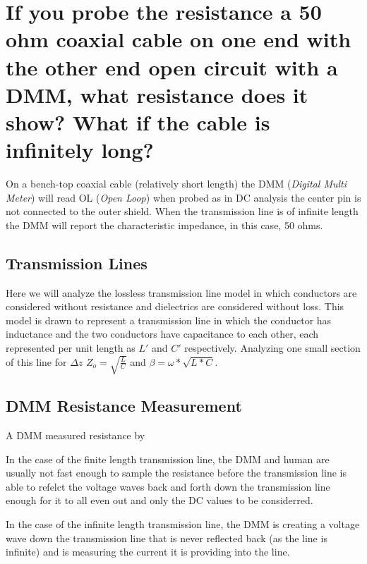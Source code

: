 \documentclass[main.tex]{subfiles}
\begin{document}
\section{If you probe the resistance a 50 ohm coaxial cable on one end with the other end open circuit with a DMM, what resistance does it show? What if the cable is infinitely long?}

\spoilerline


\noindent On a bench-top coaxial cable (relatively short length) the DMM (\textit{Digital Multi Meter}) will read OL (\textit{Open Loop}) when probed as in DC analysis the center pin is not connected to the outer shield. When the transmission line is of infinite length the DMM will report the characteristic impedance, in this case, 50 ohms.

\subsection{Transmission Lines}
Here we will analyze the lossless transmission line model in which conductors are considered without resistance and dielectrics are considered without loss. This model is drawn to represent a transmission line in which the conductor has inductance and the two conductors have capacitance to each other, each represented per unit length as $L\prime$ and $C\prime$ respectively.
Analyzing one small section of this line for $\Delta z$ 
$Z_o = \sqrt{\frac{L}{C}}$ and $\beta = \omega * \sqrt{L*C}$.

\subsection{DMM Resistance Measurement}
A DMM measured resistance by 

In the case of the finite length transmission line, the DMM and human are usually not fast enough to sample the resistance before the transmission line is able to refelct the voltage waves back and forth down the transmission line enough for it to all even out and only the DC values to be considerred.

In the case of the infinite length transmission line, the DMM is creating a voltage wave down the transmission line that is never reflected back (as the line is infinite) and is measuring the current it is providing into the line. 
\end{document}
